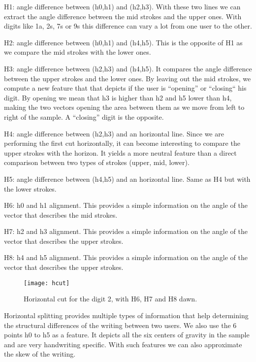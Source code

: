 \documentclass[a4paper]{article}
\begin{document}
{\vspace{2mm}
\begin{listCustom}
	\item H1: angle difference between (h0,h1) and (h2,h3). With these two lines we can extract the angle difference between the mid strokes and the upper ones. With digits like 1a,  2s, 7s or 9s this difference can vary a lot from one user to the other.
	\item H2: angle difference between (h0,h1) and (h4,h5). This is the opposite of H1 as we compare the mid strokes with the lower ones.
	\item H3: angle difference between (h2,h3) and (h4,h5). It compares the angle difference between the upper strokes and the lower ones. By leaving out the mid strokes, we compute a new feature that that depicts if the user is “opening” or “closing“ his digit. By opening we mean that h3 is higher than h2 and h5 lower than h4, making the two vectors opening the area between them as we move from left to right of the sample. A “closing” digit is the opposite.
	\item H4: angle difference between (h2,h3) and an horizontal line. Since we are performing the first cut horizontally, it can become interesting to compare the upper strokes with the horizon. It yields a more neutral feature than a direct comparison between two types of strokes (upper, mid, lower).
	\item H5: angle difference between (h4,h5) and an horizontal line. Same as H4 but with the lower strokes.
	\item H6: h0 and h1 alignment. This provides a simple information on the angle of the vector that describes the mid strokes.
	\item H7: h2 and h3 alignment. This provides a simple information on the angle of the vector that describes the upper strokes.
	\item H8: h4 and h5 alignment. This provides a simple information on the angle of the vector that describes the upper strokes.
\end{listCustom}
\vspace{2mm}

\vspace{1mm}
\begin{figure}[h!]
  \caption{Horizontal cut for the digit 2, with H6, H7 and H8 dawn.}
  \centering
    \texttt{[image: hcut]}
\end{figure}

Horizontal splitting provides multiple types of information that help determining the structural differences of the writing between two users. We also use the 6 points h0 to h5 as a feature. It depicts all the six centers of gravity in the sample and are very handwriting specific. With such features we can also approximate the skew of the writing.

}
\end{document}
